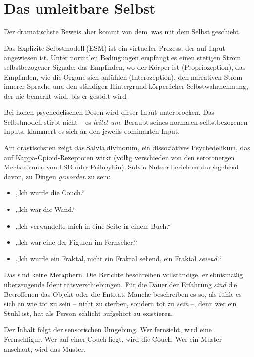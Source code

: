 \documentclass[11pt, twoside, openright]{book}
\begin{document}
\section*{Das umleitbare Selbst}

Der dramatischste Beweis aber kommt von dem, was mit dem Selbst geschieht.

Das Explizite Selbstmodell (ESM) ist ein virtueller Prozess, der auf Input angewiesen ist. Unter normalen Bedingungen empfängt es einen stetigen Strom selbstbezogener Signale: das Empfinden, wo der Körper ist (Propriozeption), das Empfinden, wie die Organe sich anfühlen (Interozeption), den narrativen Strom innerer Sprache und den ständigen Hintergrund körperlicher Selbstwahrnehmung, der nie bemerkt wird, bis er gestört wird.

Bei hohen psychedelischen Dosen wird dieser Input unterbrochen. Das Selbstmodell stirbt nicht -- es \textit{leitet um}. Beraubt seines normalen selbstbezogenen Inputs, klammert es sich an den jeweils dominanten Input.

Am drastischsten zeigt das Salvia divinorum, ein dissoziatives Psychedelikum, das auf Kappa-Opioid-Rezeptoren wirkt (völlig verschieden von den serotonergen Mechanismen von LSD oder Psilocybin). Salvia-Nutzer berichten durchgehend davon, zu Dingen \textit{geworden} zu sein:

\begin{itemize}
  \item „Ich wurde die Couch.“
  \item „Ich war die Wand.“
  \item „Ich verwandelte mich in eine Seite in einem Buch.“
  \item „Ich war eine der Figuren im Fernseher.“
  \item „Ich wurde ein Fraktal, nicht ein Fraktal sehend, ein Fraktal \textit{seiend}.“
\end{itemize}

Das sind keine Metaphern. Die Berichte beschreiben vollständige, erlebnismäßig überzeugende Identitätsverschiebungen. Für die Dauer der Erfahrung \textit{sind} die Betroffenen das Objekt oder die Entität. Manche beschreiben es so, als fühle es sich an wie tot zu sein -- nicht zu sterben, sondern tot zu \textit{sein} --, denn wer ein Stuhl ist, hat als Person schlicht aufgehört zu existieren.

Der Inhalt folgt der sensorischen Umgebung. Wer fernsieht, wird eine Fernsehfigur. Wer auf einer Couch liegt, wird die Couch. Wer ein Muster anschaut, wird das Muster.
\end{document}
